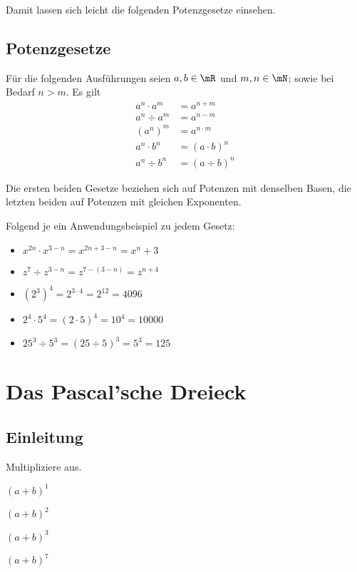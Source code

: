 \documentclass[
twoside,%
ngerman,%
headsepline%
11pt]%
{article}
\begin{document}
Damit lassen sich leicht die folgenden Potenzgesetze einsehen.

\subsection{Potenzgesetze}
F\"ur die folgenden Ausf\"uhrungen seien $a,b\in\mR$ und $m,n\in\mN$; sowie bei Bedarf $n>m$. Es gilt
\begin{align}
a^n\cdot a^m&=a^{n+m}\\
a^n\div a^m&=a^{n-m}\\
\left(a^n\right)^m&=a^{n\cdot m}\\
a^n\cdot b^n&=(a\cdot b)^{n}\\
a^n\div b^n&=(a\div b)^{n}
\end{align}
\begin{bem}
Die ersten beiden Gesetze beziehen sich auf Potenzen mit denselben Basen, die letzten beiden auf Potenzen mit gleichen Exponenten.
\end{bem}

\begin{bsps}
Folgend je ein Anwendungsbeispiel zu jedem Gesetz:
\begin{itemize}
\item $x^{2n}\cdot x^{3-n}=x^{2n+3-n}=x^n+3$
\item $z^7\div z^{3-n}=z^{7-(3-n)}=z^{n+4}$
\item $\left(2^3\right)^4=2^{3\cdot4}=2^{12}=4096$
\item $2^4\cdot5^4=(2\cdot5)^4=10^4=10000$
\item $25^3\div5^3=(25\div5)^3=5^3=125$
\end{itemize}
\end{bsps}

\section{Das Pascal'sche Dreieck}
\subsection{Einleitung}
\begin{ueb}
Multipliziere aus.
  \\[2.5ex]\hspace*{2.7ex}
  \begin{minipage}{0.4\textwidth}
    \begin{enumeratea}
      \item $(a+b)^1$
      \item $(a+b)^2$\\[1ex]
    \end{enumeratea}
  \end{minipage}
  \begin{minipage}{0.23\textwidth}
    \begin{enumeratea}\addtocounter{enumi}{2}
      \item $(a+b)^3$
      \item $(a+b)^7$\\[1ex]
    \end{enumeratea}
  \end{minipage}
  \end{ueb}
  
\end{document}
